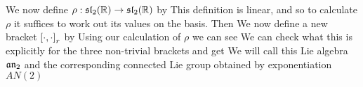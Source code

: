 \documentclass{article}
\begin{document}
We now define $\rho: \mathfrak{sl}_2 (\mathbb{R}) \to \mathfrak{sl}_2(\mathbb{R})$ by 
This definition is linear, and so to calculate $\rho$ it suffices to work out its values on the basis. Then 
We now define a new bracket $\left[ \cdot, \cdot \right]_r$ by 
Using our calculation of $\rho$ we can see 
We can check what this is explicitly for the three non-trivial brackets and get 
We will call this Lie algebra $\mathfrak{an}_2$ and the corresponding connected Lie group obtained by exponentiation $AN(2)$

\end{document}
